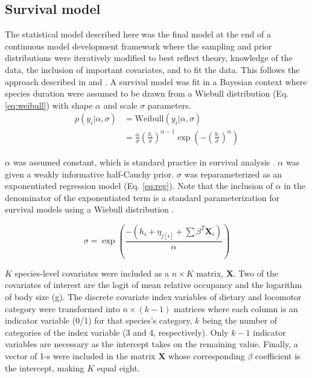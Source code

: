 \documentclass[12pt,letterpaper]{article}
\begin{document}
\subsection{Survival model}

The statistical model described here was the final model at the end of a continuous model development framework where the sampling and prior distributions were iteratively modified to best reflect theory, knowledge of the data, the inclusion of important covariates, and to fit the data. This follows the approach described in \citet{Gelman2007} and \citet{Gelman2013d}.
A survival model was fit in a Bayesian context where species duration were assumed to be drawn from a Wiebull distribution (Eq. \ref{eq:weibull}) with shape \(\alpha\) and scale \(\sigma\) parameters. 
\begin{align}
  p(y_{i}|\alpha, \sigma) &= \mathrm{Weibull}(y_{i}|\alpha, \sigma) \nonumber \\ 
  &= \frac{\alpha}{\sigma} \left(\frac{y_{i}}{\sigma}\right)^{\alpha - 1} \exp\left(-\left(\frac{y_{i}}{\sigma}\right)^{\alpha}\right) 
  \label{eq:weibull}
\end{align}

\(\alpha\) was assumed constant, which is standard practice in survival analysis \citep{Klein2003}. \(\alpha\) was given a weakly informative half-Cauchy prior. \(\sigma\) was reparameterized as an exponentiated regression model (Eq. \ref{eq:reg}). Note that the inclusion of \(\alpha\) in the denominator of the exponentiated term is a standard parameterization for survival models using a Wiebull distribution \citep{Klein2003}.

\begin{equation}
  \sigma = \exp\left(\frac{-(h_{i} + \eta_{j[i]} + \sum \beta^{T} \mathbf{X}_{i})}{\alpha}\right)
  \label{eq:reg}
\end{equation}

\(K\) species-level covariates were included as a \(n \times K\) matrix, \(\mathbf{X}\). Two of the covariates of interest are the logit of mean relative occupancy and the logarithm of body size (g). The discrete covariate index variables of dietary and locomotor category were transformed into \(n \times (k - 1)\) matrices where each column is an indicator variable (0/1) for that species's category, \(k\) being the number of categories of the index variable (3 and 4, respectively). Only \(k - 1\) indicator variables are necessary as the intercept takes on the remaining value. Finally, a vector of 1-s were included in the matrix \(\mathbf{X}\) whose corresponding \(\beta\) coefficient is the intercept, making \(K\) equal eight.
\end{document}
